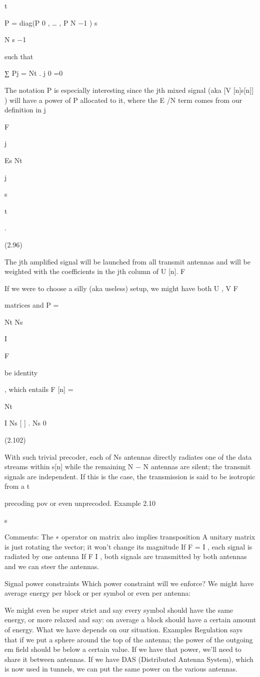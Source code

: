 {t

P = diag(P 0 , … , P N −1 )
s

N s −1

such that

∑ Pj = Nt .
j 0 =0

The notation P is especially interesting since the jth mixed signal (aka [V [n]s[n]] ) will have a power of P allocated to it, where the E /N term comes from our definition in j

F

j

Es Nt

j

s

t

.

(2.96)

The jth amplified signal will be launched from all transmit antennas and will be weighted with the coefficients in the jth column of U [n].
F

If we were to choose a silly (aka useless) setup, we might have both U , V F

matrices and P =

Nt Ns

I

F

be identity

, which entails F [n] =

Nt

I Ns
[
] .
Ns 0

(2.102)

With such trivial precoder, each of Ns antennas directly radiates one of the data streams within s[n] while the remaining N − N antennas are silent; the transmit signals are independent. If this is the case, the transmission is said to be isotropic from a t

precoding pov or even unprecoded.
Example 2.10

s

Comments:
The ∗ operator on matrix also implies transposition A unitary matrix is just rotating the vector; it won't change its magnitude If F = I , each signal is radiated by one antenna If F \neq I , both signals are transmitted by both antennas and we can steer the antennas.

Signal power constraints Which power constraint will we enforce? We might have average energy per block or per symbol or even per antenna:

We might even be super strict and say every symbol should have the same energy, or more relaxed and say: on average a block should have a certain amount of energy.
What we have depends on our situation.
Examples Regulation says that if we put a sphere around the top of the antenna; the power of the outgoing em field should be below a certain value. If we have that power, we'll need to share it between antennas.
If we have DAS (Distributed Antenna System), which is now used in tunnels, we can put the same power on the various antennas.

}
